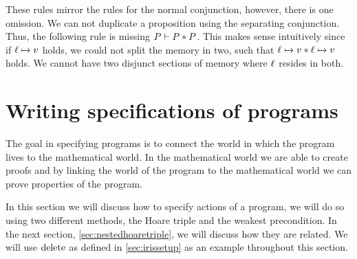 \documentclass[thesis.tex]{subfiles}
\begin{document}
These rules mirror the rules for the normal conjunction, however, there is one omission. We can not duplicate a proposition using the separating conjunction. Thus, the following rule is missing $P \vdash P * P$. This makes sense intuitively since if $\loc\fmapsto\val$ holds, we could not split the memory in two, such that $\loc\fmapsto\val * \loc\fmapsto\val$ holds. We cannot have two disjunct sections of memory where $\ell$ resides in both.

\section{Writing specifications of programs}
\label{sec:Hoare}
The goal in specifying programs is to connect the world in which the program lives to the mathematical world. In the mathematical world we are able to create proofs and by linking the world of the program to the mathematical world we can prove properties of the program.

In this section we will discuss how to specify actions of a program, we will do so using two different methods, the Hoare triple and the weakest precondition. In the next section, \cref*{sec:nestedhoaretriple}, we will discuss how they are related. We will use $\operatorname{delete}$ as defined in \cref*{sec:irissetup} as an example throughout this section.
\end{document}
